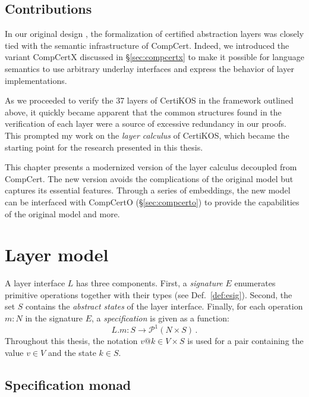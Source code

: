 \documentclass[11pt,oneside,draft]{book}
\theoremstyle{definition}
\begin{document}

\subsection{Contributions} %

In our original design \citep{popl15},
the formalization of certified abstraction layers
was closely tied with
the semantic infrastructure of CompCert.
Indeed,
we introduced the variant CompCertX discussed in \S\ref{sec:compcertx}
to make it possible for language semantics
to use arbitrary underlay interfaces and
express the behavior of layer implementations.

As we proceeded to verify the 37 layers of CertiKOS
in the framework outlined above,
it quickly became apparent that
the common structures found in the verification of each layer
were a source of excessive redundancy in our proofs.
This prompted my work on the \emph{layer calculus} of CertiKOS,
which became the starting point for the research
presented in this thesis.

This chapter
presents a modernized version of the layer calculus
decoupled from CompCert.
The new version avoids the complications of the original model
but captures its essential features.
Through a series of embeddings,
the new model can be interfaced with
CompCertO (\S\ref{sec:compcerto})
to provide the capabilities of the original model
and more.



\section{Layer model} %

A layer interface $L$ has three components.
First, a \emph{signature} $E$ enumerates
primitive operations together with their types
(see Def.~\ref{def:esig}).
Second,
the set $S$ contains the \emph{abstract states} of the layer interface.
Finally, for each operation $m \mathop: N$ in the signature $E$,
a \emph{specification}
is given as a function:
\[
  L.m : S \rightarrow \mathcal{P}^1( N \times S) \,.
\]
Throughout this thesis,
the notation $v@k \in V \times S$ is used for a pair
containing the value $v \in V$ and the state $k \in S$.

\subsection{Specification monad} %
\end{document}
